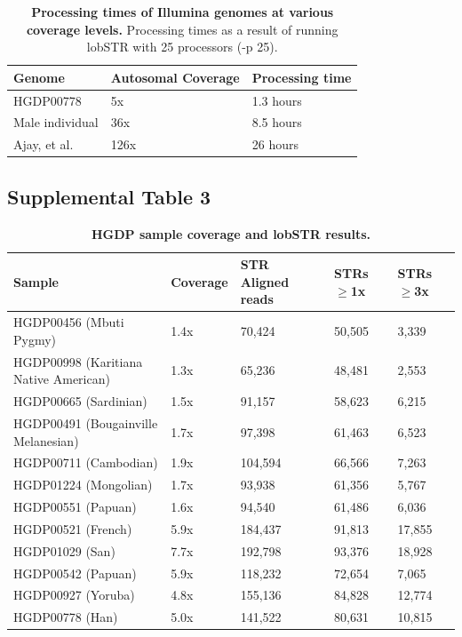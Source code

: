 \begin{table}[h!]
\centering
\label{tab:lobsuptab2}
\begin{tabular}{l l l }
\hline
Genome & Autosomal Coverage & Processing time \\
\hline
HGDP00778 &	5x &	1.3 hours\\
Male individual	& 36x	& 8.5 hours\\
Ajay, et al. &	126x	& 26 hours\\
\hline
\end{tabular}
\caption{\textbf{Processing times of Illumina genomes at various coverage levels.} Processing times as a result of running lobSTR with 25 processors (-p 25).}
\end{table}

\pagebreak

\subsection{Supplemental Table 3}
\begin{table}[h!]
\centering
\label{tab:lobsuptab3}
\begin{tabular}{l l l l l }
\hline
Sample	& Coverage& 	STR Aligned reads	& STRs $\geq$1x	& STRs $\geq$3x\\
\hline
HGDP00456 (Mbuti Pygmy)               & 1.4x & 70,424  & 50,505 & 3,339  \\
HGDP00998 (Karitiana Native American) & 1.3x & 65,236  & 48,481 & 2,553  \\
HGDP00665 (Sardinian)                 & 1.5x & 91,157  & 58,623 & 6,215  \\
HGDP00491 (Bougainville Melanesian)   & 1.7x & 97,398  & 61,463 & 6,523  \\
HGDP00711 (Cambodian)                 & 1.9x & 104,594 & 66,566 & 7,263  \\
HGDP01224 (Mongolian)                 & 1.7x & 93,938  & 61,356 & 5,767  \\
HGDP00551 (Papuan)                    & 1.6x & 94,540  & 61,486 & 6,036  \\
HGDP00521 (French)                    & 5.9x & 184,437 & 91,813 & 17,855 \\
HGDP01029 (San)                       & 7.7x & 192,798 & 93,376 & 18,928 \\
HGDP00542 (Papuan)                    & 5.9x & 118,232 & 72,654 & 7,065  \\
HGDP00927 (Yoruba)                    & 4.8x & 155,136 & 84,828 & 12,774 \\
HGDP00778 (Han)                       & 5.0x & 141,522 & 80,631 & 10,815 \\
\hline
\end{tabular}
\caption{\textbf{HGDP sample coverage and lobSTR results.}}
\end{table}

